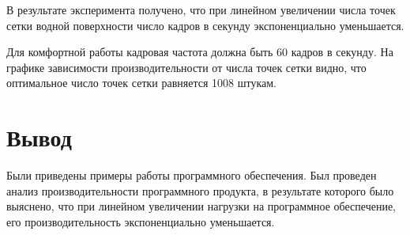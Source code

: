 В результате эксперимента получено, что при линейном увеличении числа точек сетки водной поверхности число кадров в секунду экспоненциально уменьшается. 

Для комфортной работы кадровая частота должна быть 60 кадров в секунду. На графике зависимости производительности от числа точек сетки видно, что оптимальное число точек сетки равняется 1008 штукам.

\section*{Вывод}

Были приведены примеры работы программного обеспечения. Был проведен анализ производительности программного продукта, в результате которого было выяснено, что при линейном увеличении нагрузки на программное обеспечение, его производительность экспоненциально уменьшается.